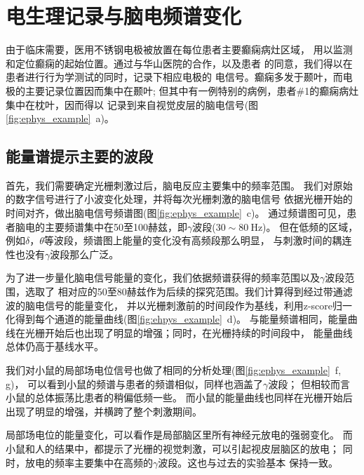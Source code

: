 
\section{电生理记录与脑电频谱变化}
由于临床需要，医用不锈钢电极被放置在每位患者主要癫痫病灶区域，
用以监测和定位癫痫的起始位置。通过与华山医院的合作，以及患者
的同意，我们得以在患者进行行为学测试的同时，记录下相应电极的
电信号。癫痫多发于颞叶，而电极的主要记录位置因而集中在颞叶;
但其中有一例特别的病例，患者\#1的癫痫病灶集中在枕叶，因而得以
记录到来自视觉皮层的脑电信号(图\ref{fig:ephys_example}~a)。

\subsection{能量谱提示主要的波段}
首先，我们需要确定光栅刺激过后，脑电反应主要集中的频率范围。
我们对原始的数字信号进行了小波变化处理，并将每次光栅刺激的脑电信号
依据光栅开始的时间对齐，做出脑电信号频谱图(图\ref{fig:ephys_example}~c)。
通过频谱图可见，患者脑电的主要频谱集中在50至100赫兹，即\(\gamma\)波段(\(30 \sim 80\ \text{Hz}\))。
但在低频的区域，例如\(\delta\)，\(\theta\)等波段，频谱图上能量的变化没有高频段那么明显，
与刺激时间的耦连性也没有\(\gamma\)波段那么广泛。

为了进一步量化脑电信号能量的变化，我们依据频谱获得的频率范围以及\(\gamma\)波段范围，选取了
相对应的50至80赫兹作为后续的探究范围。我们计算得到经过带通滤波的脑电信号的能量变化，
并以光栅刺激前的时间段作为基线，利用z-score归一化得到每个通道的能量曲线(图\ref{fig:ehpys_example}~d)。
与能量频谱相同，能量曲线在光栅开始后也出现了明显的增强；同时，在光栅持续的时间段中，
能量曲线总体仍高于基线水平。

我们对小鼠的局部场电位信号也做了相同的分析处理(图\ref{fig:ephys_example}~f, g)，
可以看到小鼠的频谱与患者的频谱相似，同样也涵盖了\(\gamma\)波段；
但相较而言小鼠的总体振荡比患者的稍偏低频一些。
而小鼠的能量曲线也同样在光栅开始后出现了明显的增强，并横跨了整个刺激期间。

局部场电位的能量变化，可以看作是局部脑区里所有神经元放电的强弱变化。
而小鼠和人的结果中，都提示了光栅的视觉刺激，可以引起视皮层脑区的放电；
同时，放电的频率主要集中在高频的\(\gamma\)波段。这也与过去的实验基本
保持一致\cite{lima2011gamma,demiralp2007gamma}。


